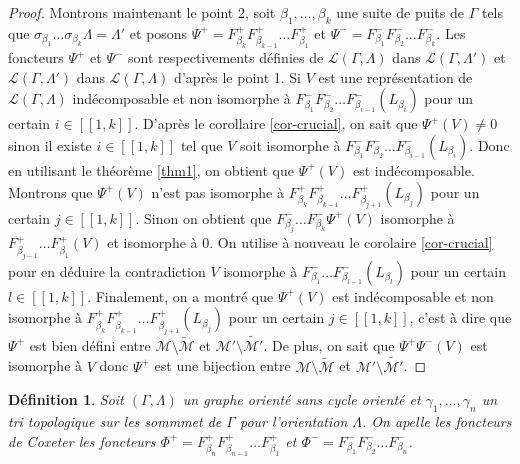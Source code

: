 \documentclass[a4paper,11pt]{article}
\newtheorem{defi}[thm]{Définition}%
\begin{document}
\begin{proof}
Montrons maintenant le point 2, soit $\beta_{1}, \dots, \beta_{k}$ une suite de puits de $\Gamma$ tels que $\sigma_{\beta_{1}}\dots\sigma_{\beta_{k}}\Lambda =  \Lambda'$ et posons $\Psi^{+} = F^{+}_{\beta_{k}}F^{+}_{\beta_{k-1}} \dots F^{+}_{\beta_{1}}$ et $\Psi^{-} = F^{-}_{\beta_{1}}F^{-}_{\beta_{2}} \dots F^{-}_{\beta_{k}}$. Les foncteurs $\Psi^{+}$ et $\Psi^{-}$ sont respectivements définies de $\mathscr L(\Gamma,\Lambda)$ dans $\mathscr L(\Gamma, \Lambda')$ et $\mathscr L(\Gamma,\Lambda')$ dans $\mathscr L(\Gamma, \Lambda)$ d'après le point 1.
Si $V$ est une représentation de $\mathscr L(\Gamma,\Lambda)$ indécomposable et non isomorphe à $F^{-}_{\beta_{1}}F^{-}_{\beta_{2}} \dots F^{-}_{\beta_{i-1}}(L_{\beta_{i}})$ pour un certain $i \in [\![1,k]\!]$. D'après le corollaire \ref{cor-crucial}, on sait que $\Psi^{+}(V) \neq 0$ sinon il existe $i \in [\![1,k]\!]$ tel que $V$ soit isomorphe  à $F^{-}_{\beta_{1}}F^{-}_{\beta_{2}} \dots F^{-}_{\beta_{i-1}}(L_{\beta_{i}})$.
Donc en utilisant le théorème \ref{thm1}, on obtient que $\Psi^{+}(V)$ est indécomposable. Montrons que $\Psi^{+}(V)$ n'est pas isomorphe à $F^{+}_{\beta_{k}}F^{+}_{\beta_{k-1}} \dots F^{+}_{\beta_{j+1}}(L_{\beta_{j}})$ pour un certain $j\in [\![1,k]\!]$. Sinon on obtient que $F^{-}_{\beta_{j}} \dots F^{-}_{\beta_{k}}\Psi^{+}(V)$ isomorphe à $F^{+}_{\beta_{j-1}} \dots F^{+}_{\beta_{1}}(V)$ et isomorphe à $0$. On utilise à nouveau le corolaire \ref{cor-crucial} pour en déduire la contradiction $V$ isomorphe à $F^{-}_{\beta_{1}} \dots F^{-}_{\beta_{l-1}}(L_{\beta_{l}})$ pour un certain $l \in [\![1,k]\!]$. Finalement, on a montré que $\Psi^{+}(V)$ est indécomposable et non isomorphe à $F^{+}_{\beta_{k}}F^{+}_{\beta_{k-1}} \dots F^{+}_{\beta_{j+1}}(L_{\beta_{j}})$ pour un certain $j\in [\![1,k]\!]$, c'est à dire que $\Psi^{+}$ est bien défini entre $\mathscr M \setminus \widetilde{\mathscr M}$ et  $\mathscr M' \setminus \widetilde{\mathscr M'}$. De plus, on sait que $\Psi^{+}\Psi^{-}(V)$ est isomorphe à $V$ donc $\Psi^{+}$ est une bijection entre $\mathscr M \setminus \widetilde{\mathscr M}$ et  $\mathscr M' \setminus \widetilde{\mathscr M'}$.
\end{proof}

\begin{defi}
	Soit $(\Gamma,\Lambda)$ un graphe orienté sans cycle orienté et $\gamma_{1}, \dots, \gamma_{n}$ un tri topologique sur les sommmet de $\Gamma$ pour l'orientation $\Lambda$. On apelle les \emph{foncteurs de Coxeter} les foncteurs $\Phi^{+} = F^{+}_{\beta_{n}}F^{+}_{\beta_{n-1}} \dots F^{+}_{\beta_{1}}$ et $\Phi^{-} = F^{-}_{\beta_{1}}F^{-}_{\beta_{2}} \dots F^{-}_{\beta_{n}}$.
\end{defi}
\end{document}
